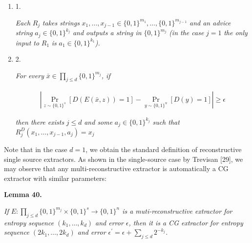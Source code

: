 \documentclass[10pt,a4paper]{article}
\begin{document}
\begin{enumerate}


\item[] 
1. 


\emph{Each }$R_{j}$\emph{ takes strings }$x_{1},\ldots,x_{j-1}\in\{0,1\}^{m_{1}},\ldots,\{0,1\}^{m_{j-1}}$\emph{ and an advice string }$a_{j}\in\{0,1\}^{k_{j}}$\emph{ and outputs a string in }$\{0,1\}^{m_{j}}$\emph{ (in the case }$j=1$\emph{ the only input to }$R_{1}$\emph{ is }$a_{1}\in\{0,1\}^{k_{1}}$\emph{).}\par





\item[] 
2. 


\emph{For every }$\bar{x}\in\prod_{j\leq d}\{0,1\}^{m_{j}}$\emph{, if}\par


\[\begin{gathered}
|\Pr_{z\sim\{0,1\}^{s}}[D(E(\bar{x},z))=1]-\Pr_{y\sim\{0,1\}^{n}}[D(y)=1]|\geq\epsilon
\end{gathered}\]


\emph{then there exists }$j\leq d$\emph{ and some }$a_{j}\in\{0,1\}^{k_{j}}$\emph{ such that }$R^{D}_{j}(x_{1},\ldots,x_{j-1},a_{j})=x_{j}$\emph{}\par





\end{enumerate}






Note that in the case $d=1$, we obtain the standard definition of reconstructive single source extractors. As shown in the single-source case by Trevisan [29], we may observe that any multi-reconstructive extractor is automatically a CG extractor with similar parameters:\par





\par\medskip\noindent\textbf{
\textbf{Lemma 40}\textbf{.}
}\par



\emph{If $E:\prod_{j\leq d}\{0,1\}^{m_{j}}\times\{0,1\}^{s}\to\{0,1\}^{n}$ is a muti-reconstructive extractor for entropy sequence $(k_{1},\ldots,k_{d})$ and error $\epsilon$, then it is a CG extractor for entropy sequence $(2k_{1},\ldots,2k_{d})$ and error $\epsilon^{\prime}=\epsilon+\sum_{j\leq d}2^{-k_{j}}$.}\par
\end{document}
